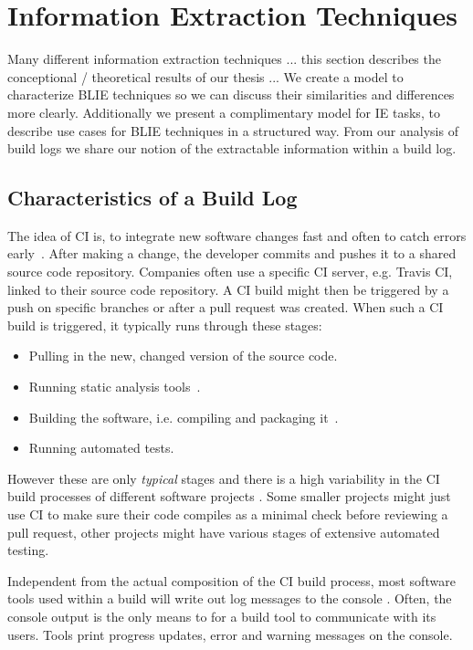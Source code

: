 \documentclass[\myrootdir/main.tex]{subfiles}
\begin{document}
\chapter{Information Extraction Techniques}
\label{sec:models}
Many different information extraction techniques ... this section describes the conceptional / theoretical results of our thesis ...
We create a model to characterize BLIE techniques so we can discuss their similarities and differences more clearly.
Additionally we present a complimentary model for IE tasks, to describe use cases for BLIE techniques in a structured way.
From our analysis of build logs we share our notion of the extractable information within a build log.

\section{Characteristics of a Build Log}
The idea of CI is, to integrate new software changes fast and often to catch errors early~\cite{humble2010continuous}. After making a change, the developer commits and pushes it to a shared source code repository. Companies often use a specific CI server, e.g. Travis CI, linked to their source code repository. A CI build might then be triggered by a push on specific branches or after a pull request was created. When such a CI build is triggered, it typically runs through these stages:
\begin{itemize}
	\item Pulling in the new, changed version of the source code.
	\item Running static analysis tools~\cite{zampetti2017open}.
	\item Building the software, i.e. compiling and packaging it~\cite{phillips2014understanding}.
	\item Running automated tests.
\end{itemize}
However these are only \emph{typical} stages and there is a high variability in the CI build processes of different software projects . Some smaller projects might just use CI to make sure their code compiles as a minimal check before reviewing a pull request, other projects might have various stages of extensive automated testing.

Independent from the actual composition of the CI build process, most software tools used within a build will write out log messages to the console . Often, the console output is the only means to for a build tool to communicate with its users. Tools print progress updates, error and warning messages on the console.
\end{document}

